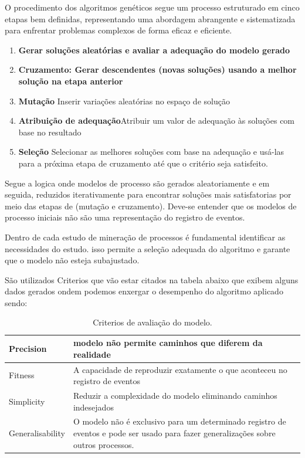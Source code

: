 \documentclass[tcc2]{classe_uftex/uftex}
\begin{document}
O procedimento dos algoritmos genéticos segue um processo estruturado em cinco etapas bem definidas\cite{greyling2017application}, representando uma abordagem abrangente e sistematizada para enfrentar problemas complexos de forma eficaz e eficiente.

\begin{enumerate}
    \item \textbf{Gerar soluções aleatórias e avaliar a adequação do modelo gerado}
    
    \item \textbf{Cruzamento: Gerar descendentes (novas soluções) usando a melhor solução na etapa anterior}
    
    \item \textbf{Mutação}  Inserir variações aleatórias no espaço de solução
    
     \item \textbf{Atribuição de adequação}Atribuir um valor de adequação às soluções com base no resultado

      \item \textbf{Seleção} Selecionar as melhores soluções com base na adequação e usá-las para a próxima etapa de cruzamento até que o critério seja satisfeito.

      \end{enumerate}

Segue a logica onde modelos de processo são gerados aleatoriamente e em seguida, reduzidos iterativamente para encontrar soluções mais satisfatorias por meio das etapas de (mutação e cruzamento). Deve-se entender que os modelos de processo iniciais não são uma representação do registro de eventos.

Dentro de cada estudo de mineração de processos é fundamental identificar as necessidades do estudo. isso permite a seleção adequada do algoritmo e garante que o modelo não esteja subajustado. 

São utilizados Criterios\cite{greyling2017application} que vão estar citados na tabela abaixo que exibem alguns dados gerados ondem podemos enxergar o desempenho do algoritmo aplicado sendo:

\begin{table}[ht]
\centering
\begin{tabularx}{0.8\textwidth} { 
  | >{\raggedright\arraybackslash}X 
  | >{\centering\arraybackslash}X 
  | >{\raggedleft\arraybackslash}X | }
 \hline
 Precision &  modelo não permite caminhos que diferem da realidade \\
 \hline
 Fitness  & A capacidade de reproduzir exatamente o que aconteceu no registro de eventos    \\
\hline
 Simplicity  & Reduzir a complexidade do modelo eliminando caminhos indesejados    \\
\hline
Generalisability  &  O modelo não é exclusivo para um determinado registro de eventos e pode ser usado para fazer generalizações sobre outros processos.   \\
\hline
\end{tabularx}
\caption{Criterios de avaliação do modelo. \cite{greyling2017application}}
\label{tab:minhatabela}
\end{table}
\end{document}
